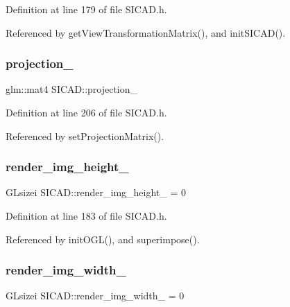Definition at line 179 of file S\+I\+C\+A\+D.\+h.



Referenced by get\+View\+Transformation\+Matrix(), and init\+S\+I\+C\+A\+D().

\mbox{\label{classSICAD_afb91b682fd1f6629f163ab321869e7e0}} 
\subsubsection{\texorpdfstring{projection\+\_\+}{projection\_}}
{\footnotesize\ttfamily glm\+::mat4 S\+I\+C\+A\+D\+::projection\+\_\+\hspace{0.3cm}{\ttfamily [private]}}



Definition at line 206 of file S\+I\+C\+A\+D.\+h.



Referenced by set\+Projection\+Matrix().

\mbox{\label{classSICAD_a29691bc258b500253364c9688f7af655}} 
\subsubsection{\texorpdfstring{render\+\_\+img\+\_\+height\+\_\+}{render\_img\_height\_}}
{\footnotesize\ttfamily G\+Lsizei S\+I\+C\+A\+D\+::render\+\_\+img\+\_\+height\+\_\+ = 0\hspace{0.3cm}{\ttfamily [private]}}



Definition at line 183 of file S\+I\+C\+A\+D.\+h.



Referenced by init\+O\+G\+L(), and superimpose().

\mbox{\label{classSICAD_acbd2113a0cc446db6f59fdedd890aad9}} 
\subsubsection{\texorpdfstring{render\+\_\+img\+\_\+width\+\_\+}{render\_img\_width\_}}
{\footnotesize\ttfamily G\+Lsizei S\+I\+C\+A\+D\+::render\+\_\+img\+\_\+width\+\_\+ = 0\hspace{0.3cm}{\ttfamily [private]}}



